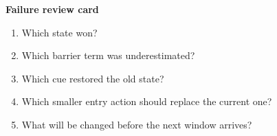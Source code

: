 \begin{templatebox}
\textbf{Failure review card}
\begin{enumerate}[nosep]
  \item Which state won?
  \item Which barrier term was underestimated?
  \item Which cue restored the old state?
  \item Which smaller entry action should replace the current one?
  \item What will be changed before the next window arrives?
\end{enumerate}
\end{templatebox}

